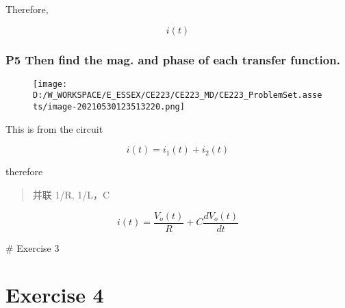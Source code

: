 \documentclass[
]{article}
\begin{document}
Therefore,

\[i(t)\]

\hypertarget{header-n177}{%
\subsubsection{P5 Then find the mag. and phase of each transfer
function.}\label{header-n177}}

\begin{figure}
\centering
\texttt{[image: D:/W\_WORKSPACE/E\_ESSEX/CE223/CE223\_MD/CE223\_ProblemSet.assets/image-20210530123513220.png]}
\caption{}
\end{figure}

This is from the circuit

\[i(t) = i_1(t)+i_2(t)\]

therefore

\begin{quote}
并联 1/R, 1/L，C
\end{quote}

\[i(t) = \frac{V_o(t)}{R}+C\frac{dV_o(t)}{dt}\]

\# Exercise 3

\hypertarget{header-n201}{%
\section{Exercise 4}\label{header-n201}}
\end{document}
